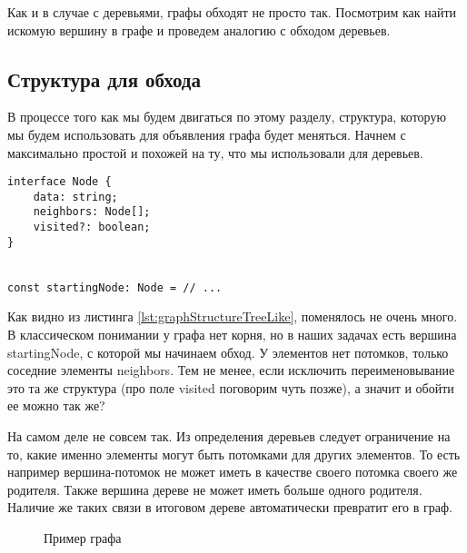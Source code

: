 \documentclass[../article.tex]{subfiles}
\begin{document}

{Как и в случае с деревьями, графы обходят не просто так. Посмотрим как найти искомую вершину в графе и проведем аналогию с обходом деревьев.}

\subsection{Структура для обхода}

В процессе того как мы будем двигаться по этому разделу, структура, которую мы будем использовать для объявления графа будет меняться. Начнем с максимально простой и похожей на ту, что мы использовали для деревьев.

\begin{ruledelement}
    \begin{lstlisting}[caption={Структура вершины графа}, label={lst:graphStructureTreeLike}]
interface Node {
    data: string;
    neighbors: Node[];
    visited?: boolean;
}


const startingNode: Node = // ...
    \end{lstlisting}
\end{ruledelement}

Как видно из листинга \ref{lst:graphStructureTreeLike}, поменялось не очень много. В классическом понимании у графа нет корня, но в наших задачах есть вершина {\firacodebold startingNode}, с которой мы начинаем обход. У элементов нет потомков, только соседние элементы {\firacodebold neighbors}. Тем не менее, если исключить переименовывание это та же структура (про поле {\firacodebold visited} поговорим чуть позже), а значит и обойти ее можно так же?

На самом деле не совсем так. Из определения деревьев следует ограничение на то, какие именно элементы могут быть потомками для других элементов. То есть например вершина-потомок не может иметь в качестве своего потомка своего же родителя. Также вершина дереве не может иметь больше одного родителя. Наличие же таких связи в итоговом дереве автоматически превратит его в граф.

\begin{figure}
    \caption{Пример графа}
    \label{fig:treeTurningToGraph}
\end{figure}
\end{document}
